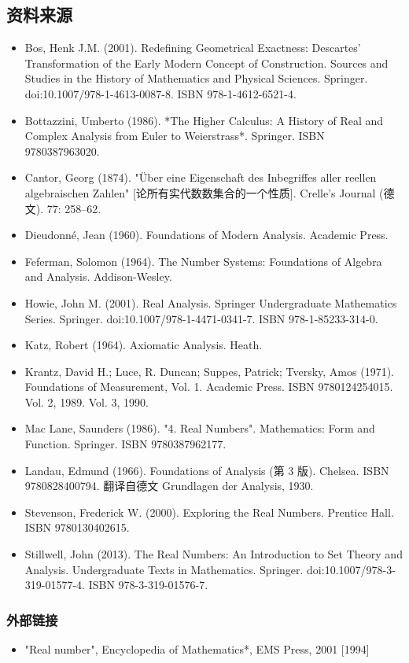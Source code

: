 \subsection{资料来源}
\begin{itemize}
\item Bos, Henk J.M. (2001). Redefining Geometrical Exactness: Descartes' Transformation of the Early Modern Concept of Construction. Sources and Studies in the History of Mathematics and Physical Sciences. Springer. doi:10.1007/978-1-4613-0087-8. ISBN 978-1-4612-6521-4.
\item Bottazzini, Umberto (1986). *The Higher Calculus: A History of Real and Complex Analysis from Euler to Weierstrass*. Springer. ISBN 9780387963020.
\item Cantor, Georg (1874). "Über eine Eigenschaft des Inbegriffes aller reellen algebraischen Zahlen" [论所有实代数数集合的一个性质]. Crelle's Journal (德文). 77: 258–62.
\item Dieudonné, Jean (1960). Foundations of Modern Analysis. Academic Press.
\item Feferman, Solomon (1964). The Number Systems: Foundations of Algebra and Analysis. Addison-Wesley.
\item  Howie, John M. (2001). Real Analysis. Springer Undergraduate Mathematics Series. Springer. doi:10.1007/978-1-4471-0341-7. ISBN 978-1-85233-314-0.
\item Katz, Robert (1964). Axiomatic Analysis. Heath.
\item Krantz, David H.; Luce, R. Duncan; Suppes, Patrick; Tversky, Amos (1971). Foundations of Measurement, Vol. 1. Academic Press. ISBN 9780124254015. Vol. 2, 1989. Vol. 3, 1990.
\item Mac Lane, Saunders (1986). "4. Real Numbers". Mathematics: Form and Function. Springer. ISBN 9780387962177.
\item Landau, Edmund (1966). Foundations of Analysis (第 3 版). Chelsea. ISBN 9780828400794. 翻译自德文 Grundlagen der Analysis, 1930.
\item Stevenson, Frederick W. (2000). Exploring the Real Numbers. Prentice Hall. ISBN 9780130402615.
\item Stillwell, John (2013). The Real Numbers: An Introduction to Set Theory and Analysis. Undergraduate Texts in Mathematics. Springer. doi:10.1007/978-3-319-01577-4. ISBN 978-3-319-01576-7.
\end{itemize}
\subsubsection{外部链接}
\begin{itemize}
\item "Real number", Encyclopedia of Mathematics*, EMS Press, 2001 [1994]
\end{itemize}
